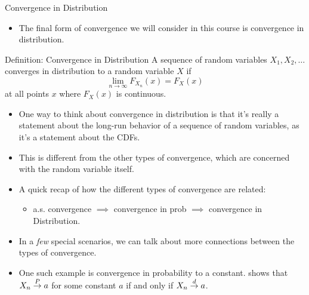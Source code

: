 \begin{frame}[allowframebreaks]{Convergence in Distribution}
  \begin{itemize}
    \item The final form of convergence we will consider in this course is convergence in distribution.
  \end{itemize}
  
  \begin{block}{Definition: Convergence in Distribution}
    A sequence of random variables $X_1, X_2, \ldots$ \alert{converges in distribution} to a random variable $X$ if
    $$
    \lim_{n \rightarrow \infty} F_{X_n}(x) = F_X(x)
    $$
    at all points $x$ where $F_X(x)$ is continuous.
  \end{block}
  
  \begin{itemize}
    \item One way to think about convergence in distribution is that it's really a statement about the long-run behavior of a sequence of random variables, as it's a statement about the CDFs. 
    \item This is different from the other types of convergence, which are concerned with the random variable itself.
    \item A quick recap of how the different types of convergence are related:
    \begin{itemize}
      \item a.s. convergence $\implies$ convergence in prob $\implies$ convergence in Distribution.
    \end{itemize}
    \item In a \emph{few} special scenarios, we can talk about more connections between the types of convergence.
    \item One such example is convergence in probability to a constant. \citet[Theorem~5.5.13 of][]{casella24} shows that $X_n \overset{P}{\rightarrow} a$ for some constant $a$ if and only if $X_n \overset{d}{\rightarrow} a$. 
  \end{itemize}
  
\end{frame}

